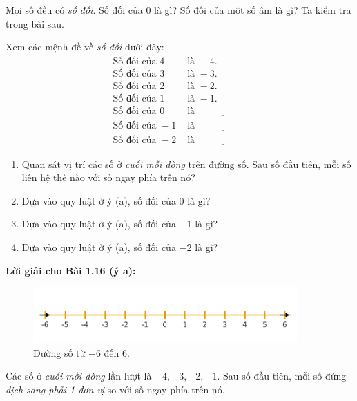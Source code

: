 \begin{problem}[1.16]
Mọi số đều có \emph{số đối}. Số đối của \(0\) là gì? Số đối của một số âm
là gì? Ta kiểm tra trong bài sau.

\begin{problem}[1.16]
Xem các mệnh đề về \emph{số đối} dưới đây:
\[
\begin{aligned}
\text{Số đối của }4 &\text{ là } -4.\\
\text{Số đối của }3 &\text{ là } -3.\\
\text{Số đối của }2 &\text{ là } -2.\\
\text{Số đối của }1 &\text{ là } -1.\\
\text{Số đối của }0 &\text{ là }\ \underline{\hspace{2cm}}\\
\text{Số đối của }-1 &\text{ là }\ \underline{\hspace{2cm}}\\
\text{Số đối của }-2 &\text{ là }\ \underline{\hspace{2cm}}
\end{aligned}
\]
\begin{enumerate}[label=(\alph*)]
  \item Quan sát vị trí các số ở \emph{cuối mỗi dòng} trên đường số.
        Sau số đầu tiên, mỗi số liên hệ thế nào với số ngay phía trên nó?
  \item Dựa vào quy luật ở ý (a), số đối của \(0\) là gì?
  \item Dựa vào quy luật ở ý (a), số đối của \(-1\) là gì?
  \item Dựa vào quy luật ở ý (a), số đối của \(-2\) là gì?
\end{enumerate}
\end{problem}

\noindent\textbf{Lời giải cho Bài 1.16 (ý a):}
\begin{figure}[ht!]
  \centering
  \includegraphics[width=0.9\textwidth]{img/fig-numberline.pdf}
  \caption*{\small Đường số từ \(-6\) đến \(6\).}
\end{figure}

Các số ở \emph{cuối mỗi dòng} lần lượt là \(-4,-3,-2,-1\).
Sau số đầu tiên, mỗi số đứng \emph{dịch sang phải 1 đơn vị}
so với số ngay phía trên nó.



\end{problem}
